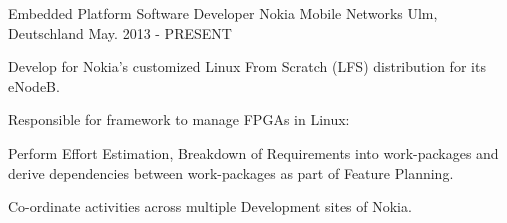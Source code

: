   \cventry
    {Embedded Platform Software Developer} %
    {Nokia Mobile Networks} %
    {Ulm, Deutschland} %
    {May. 2013 - PRESENT} %
    {
      \begin{cvitems} %
      \item {Develop for  Nokia's customized Linux From Scratch (LFS) distribution for its eNodeB.}
      \item {Responsible for framework to manage FPGAs in Linux:}
	\item {Perform Effort Estimation, Breakdown of Requirements into work-packages and derive dependencies between work-packages as part of Feature Planning.}
	\item {Co-ordinate activities across multiple Development sites of Nokia.}
      \end{cvitems}
  }
